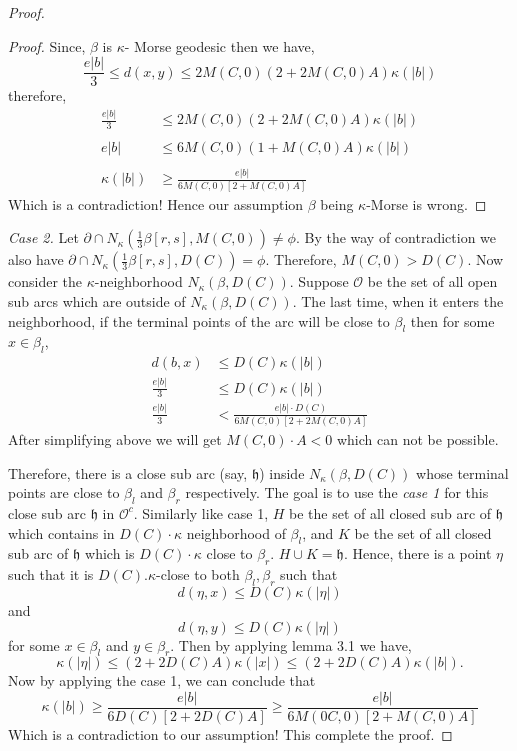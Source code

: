 \documentclass[10pt,a4paper]{amsart}
\newcommand{\p}{\partial}
\begin{document}
\begin{proof}
\begin{proof}
\newline 
Since, $\beta$ is $\kappa$- Morse geodesic then we have,
\[\frac{e|b|}{3} \leq d(x,y) \leq 2M(C,0)(2+2M(C,0)A)\kappa(|b|)\] 
therefore,
\begin{equation} 
\begin{split}
 \frac{e|b|}{3}&\leq 2M(C,0)(2+2M(C,0)A)\kappa(|b|) \\\\
   {e|b|} &\leq 6M(C,0)(1+M(C,0)A)\kappa(|b|)\\\\
    \kappa(|b|)&\geq \frac{e|b|}{6M(C,0)[2+M(C,0)A]} 
\end{split}
\end{equation}
Which is a contradiction! Hence our assumption $\beta$ being $\kappa$-Morse is wrong.\end{proof}

\textit{Case 2.}  Let $\p \cap N_\kappa(\frac{1}{3}\beta[r,s], M(C,0)) \neq \phi $. By the way of contradiction we also have $\p \cap N_\kappa(\frac{1}{3}\beta[r,s], D(C))= \phi $. Therefore, $M(C,0) > D(C)$.
\newline Now consider the $\kappa$-neighborhood $N_\kappa(\beta, D(C))$. Suppose $\mathcal{O}$ be the set of all open sub arcs which are outside of $N_\kappa(\beta, D(C))$. 
 The last time, when it enters the neighborhood, if the terminal points of the arc will be close to $\beta_l$ then for some $x \in \beta_l$, 
 \begin{align*}
d(b,x)&\leq D(C)\kappa(|b|)\\ 
   \frac{e|b|}{3} & \leq D(C)\kappa(|b|)\\
   \frac{e|b|}{3}&< \frac{e|b|\cdot D(C)}{6M(C,0)[2+2M(C,0)A]}
 \end{align*}
 After simplifying above we will get $M(C,0)\cdot A < 0$ which can not be possible. \newline
 
 Therefore, there is a close sub arc (say, $\mathfrak{h}$) inside  $N_\kappa(\beta, D(C))$ whose terminal points are close to $\beta_l$ and $\beta_r$ respectively.  The goal is to use the \textit{case 1} for this close sub arc $\mathfrak{h}$ in $\mathcal{O}^c$. Similarly like case 1, $H$ be the set of all closed sub arc of $\mathfrak{h}$ which contains in $D(C)\cdot\kappa$ neighborhood of $\beta_l$, and $K$ be the set of all closed sub arc of $\mathfrak{h}$ which is $D(C)\cdot\kappa$ close to $\beta_r$. $H\cup K= \mathfrak{h}$. Hence, there is a point $\eta$ such that it is $D(C).\kappa$-close to both $\beta_l,\beta_r$ such that
 \[ d(\eta,x)\leq D(C)\kappa(|\eta|)\]
 and \[d(\eta,y)\leq D(C)\kappa(|\eta|)\]
 for some $x \in \beta_l$ and $y\in \beta_r$. Then by applying lemma 3.1 we have, \[\kappa(|\eta|)\leq (2+2D(C)A)\kappa(|x|)\leq (2+2D(C)A)\kappa(|b|).\]
Now by applying the case 1, we can conclude that\[\kappa(|b|)\geq \frac{e|b|}{6D(C)[2+2D(C)A]} \geq \frac{e|b|}{6M(0C,0)[2+M(C,0)A]}\] 
Which is a contradiction to our assumption! This complete the proof.\end{proof}
\end{document}
